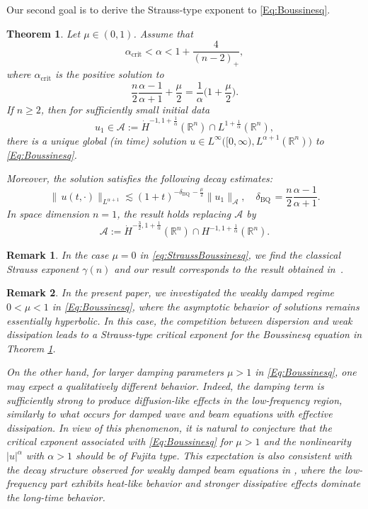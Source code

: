 \documentclass[10pt]{article}
\newtheorem{theorem}{Theorem}[section]
\newtheorem{remark}{Remark}[section]
\newcommand{\<}{\langle}
\renewcommand{\>}{\rangle}
\numberwithin{equation}{section}
\newcommand{\BQ}{{\mathrm{BQ\,}}}
\begin{document}
Our second goal is to derive the Strauss-type exponent to \eqref{Eq:Boussinesq}.
\begin{theorem}\label{thm:NBQ}
Let $\mu\in (0,1)$. Assume that
\[ \alpha_{\text{crit}}<\alpha<1+\frac{4}{(n-2)_+}, \]
where $\alpha_{\text{crit}}$ is the positive solution to
\begin{equation}\label{eq:StraussBoussinesq}
\frac{n}2\frac{\alpha-1}{\alpha+1}+\frac{\mu}{2}=\frac1\alpha\Big( 1+\frac{\mu}{2} \Big).
\end{equation}
If $n\geq 2$, then for sufficiently small initial data
\[ u_1\in\mathcal{A}:= \dot H^{-1, 1+\frac1\alpha}(\mathbb{R}^n)\cap L^{1+\frac1\alpha}(\mathbb{R}^n),\]
there is a unique global (in time)  solution $u\in L^\infty\big( [0, \infty), L^{\alpha+1}(\mathbb{R}^n) \big)$ to \eqref{Eq:Boussinesq}.

Moreover, the solution satisfies the following decay estimates:
\begin{equation}\label{eq:decayNIBQ}
\|\, u(t,\cdot)\|_{L^{\alpha+1}} \lesssim (1+t)^{-\delta_\BQ-\frac{\mu}2}\|u_1\|_{\mathcal{A}},\quad \delta_\BQ=\frac{n}2 \frac{\alpha-1}{\alpha+1}.
\end{equation}
In space dimension $n=1$, the result holds replacing $\mathcal{A}$ by
\[\mathcal{A}:= \dot H^{-\frac32, 1+\frac1\alpha}(\mathbb{R}^n)\cap H^{-1, 1+\frac1\alpha}(\mathbb{R}^n).\]
\end{theorem}
\begin{remark}
In the case $\mu=0$ in \eqref{eq:StraussBoussinesq}, we find the classical Strauss exponent $\gamma(n)$ and our result corresponds to the result obtained in~\cite[Theorem 2]{Cho-Ozawa=2007}.
\end{remark}
\begin{remark}
In the present paper, we investigated the weakly damped regime $0<\mu<1$ in \eqref{Eq:Boussinesq}, where the asymptotic behavior of solutions remains essentially hyperbolic. In this case, the competition between dispersion and weak dissipation leads to a Strauss-type critical exponent for the Boussinesq equation in Theorem \ref{thm:NBQ}.

On the other hand, for larger damping parameters $\mu>1$ in \eqref{Eq:Boussinesq}, one may expect a qualitatively different behavior. Indeed, the damping term is sufficiently strong to produce diffusion-like effects in the low-frequency region, similarly to what occurs for damped wave and beam equations with effective dissipation. In view of this phenomenon, it is natural to conjecture that the critical exponent associated with \eqref{Eq:Boussinesq} for $\mu>1$ and the nonlinearity $|u|^\alpha$ with $\alpha>1$ should be of Fujita type. This expectation is also consistent with the decay structure observed for weakly damped beam equations in \cite{Ikehata-Soga=2015, Takeda-Yoshikawa=2012, Takeda-Yoshikawa=2013}, where the low-frequency part exhibits heat-like behavior and stronger dissipative effects dominate the long-time behavior.
\end{remark}
\end{document}
